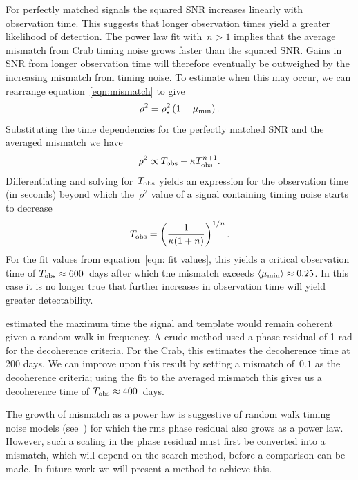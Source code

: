 \documentclass[../full_thesis/full_thesis.tex]{subfiles}
\begin{document}
For perfectly matched signals the squared SNR
increases linearly \citep{Prix2009} with observation time.
This suggests that longer observation
times yield a greater likelihood of detection. The power law fit with~$n > 1$
implies that the average mismatch from
Crab timing noise grows faster than the squared SNR.
Gains in
SNR from longer observation time will therefore eventually be
outweighed by the increasing mismatch from timing noise.
To estimate when this may occur, we can rearrange equation~\eqref{eqn:mismatch}
to give
\begin{equation}
    \rho^{2} = \rho^{2}_{\mathrm{s}}\left(1 - \mu_{\mathrm{min}}\right).
\end{equation}
Substituting the time dependencies for the perfectly matched SNR and the
averaged mismatch we have
\begin{equation}
    \rho^{2} \propto T_{\textrm{obs}} - \kappa T_{\textrm{obs}}^{n+1}.
\end{equation}
Differentiating and solving for~$T_{\textrm{obs}}$ yields an expression for the
observation time (in seconds)
beyond which the~$\rho^{2}$ value of a signal containing timing 
noise starts to decrease
\begin{equation}
T_{\textrm{obs}} = \left(\frac{1}{\kappa(1+n)}\right)^{1/n}.
\end{equation}
For the fit values from equation~\eqref{eqn: fit values}, this yields
a critical observation time of
$T_{\textrm{obs}}\approx 600$~days after which the mismatch exceeds
$\langle\mu_{\mathrm{min}}\rangle \approx 0.25$.
In this case it is no longer true that further increases in
observation time will yield greater detectability.

\citet{Jones2004} estimated the maximum time the signal and template would
remain coherent given a random walk in  frequency. A crude method used a
phase residual of 1 rad for the decoherence criteria. For the Crab, this
estimates the decoherence time at 200 days. We can improve upon this result by
setting a mismatch of~$0.1$ as the decoherence criteria; using the fit to the
averaged mismatch this gives us a decoherence time of $T_{\textrm{obs}}\approx 400 $~days.

    The growth of mismatch as a power law is suggestive of
random walk timing noise models (see~\citet{Cordes1981}) 
    for which the rms phase residual also grows as a power law. However,
    such a scaling in the phase residual must first be converted into a mismatch,
    which will depend on the search method, before a comparison can be made. In 
    future work we will present a method to achieve this.
\end{document}
